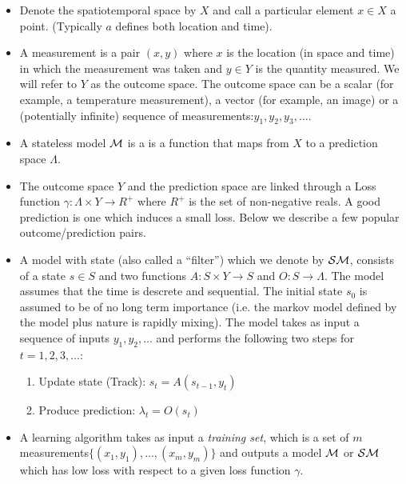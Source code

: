 \begin{itemize}

\item Denote the spatiotemporal space by $X$ and call a particular
  element $x \in X$ a point. (Typically $a$ defines both location and time).

\item A measurement is a pair $(x,y)$ where $x$ is the location (in
  space and time) in which the measurement was taken and $y \in Y$ is the
  quantity measured. We will refer to $Y$ as the outcome space. The
  outcome space can be a scalar (for example, a temperature
  measurement), a vector (for example, an image) or a (potentially
  infinite) sequence of measurements:$y_1,y_2,y_3,\ldots$.

\item A stateless model $\cM$ is a is a function that maps from $X$ to a
  prediction space $\Lambda$.  

\item The outcome space $Y$ and the prediction space are linked
  through a Loss function $\gamma:\Lambda \times Y \to R^+$ where
  $R^+$ is the set of non-negative reals. A good prediction is one
  which induces a small loss. Below we describe a few popular
  outcome/prediction pairs.

\item A model with state (also called a ``filter'') which we denote by
  $\cSM$, consists of a state $s \in S$ and two
  functions $A: S \times Y \to S$ and $O: S \to \Lambda$. The
  model assumes that the time is descrete and sequential.
  The initial state $s_0$ is assumed to be of no long term importance
  (i.e. the markov model defined by the model plus nature is rapidly
  mixing). The model takes as input a sequence of inputs
  $y_1,y_2,\ldots$ and performs the following two steps for $t=1,2,3,\ldots$:
  \begin{enumerate}
    \item Update state (Track): $s_t = A(s_{t-1},y_t)$
    \item Produce prediction: $\lambda_t=O(s_t)$
  \end{enumerate}

\item A learning algorithm takes as input a {\em training set}, which
  is a set of $m$ measurements$\{(x_1,y_1),\ldots,(x_m,y_m)\}$ and
  outputs a model $\cM$ or $\cSM$ which  has low loss with respect to
  a given loss function $\gamma$.
\end{itemize}

